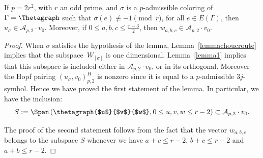 \begin{Lemma}\label{lemma3}If $p=2r^2$, with $r$ an odd prime, and $\sigma$ is a $p$-admissible coloring of $\Gamma=\Thetagraph$ such that $\sigma(e) \not\equiv -1 \pmod{r}$, for all $e\in E(\Gamma)$, then $u_{\sigma}\in \mathcal{A}_{p,2}\cdot v_0$. Moreover, if $0\leq a,b,c \leq \frac{r-3}{2}$, then $w_{a,b,c}\in \mathcal{A}_{p,2}\cdot v_0$.
\end{Lemma}

\begin{proof} When $\sigma$ satisfies the hypothesis of the lemma, Lemma~\ref{lemmachoucroute} implies that the sub\-spa\-ce~$W_{[\sigma]}$ is one dimensional. Lemma~\ref{lemma1} implies that this subspace is included either in $\mathcal{A}_{p,2}\cdot v_0$, or in its orthogonal. Moreover the Hopf pairing $\left( u_{\sigma}, v_0 \right)^H_{p,2}$ is nonzero since it is equal to a $p$-admissible $3j$-symbol. Hence we have proved the first statement of the lemma. In particular, we have the inclusion:
\begin{gather*} S:=\Span \left(\thetagraph{$u$}{$v$}{$w$}, 0\leq u,v,w \leq r-2 \right) \subset \mathcal{A}_{p,2}\cdot v_0.\end{gather*}

The proof of the second statement follows from the fact that the vector $w_{a,b,c}$ belongs to the subspace $S$ whenever we have $a+c\leq r-2$, $b+c\leq r-2$ and $a+b\leq r-2$.
\end{proof}

